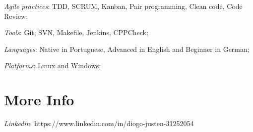 \documentclass[margin]{res}
\begin{document}
\begin{resume}
 \textit{Agile practices}: TDD, SCRUM, Kanban, Pair programming, Clean code, Code Review;
 
 \textit{Tools}: Git, SVN, Makefile, Jenkins, CPPCheck;
 
 \textit{Languages}: Native in Portuguese, Advanced in English and Beginner in German;

 \textit{Platforms}: Linux and Windows;
 
\section{More Info} \textit{Linkedin}: https://www.linkedin.com/in/diogo-justen-31252054

\end{resume}
\end{document}
